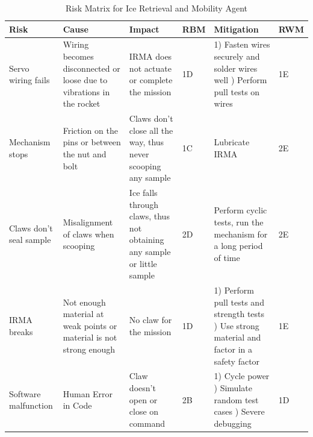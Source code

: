 \begin{table}[]
            \label{IRMA}
            {\footnotesize
            \caption{Risk Matrix for Ice Retrieval and Mobility Agent}
            \centering
            \begin{tabularx}{\linewidth}{XXXlXl}
            \toprule
            \textbf{Risk}                                            & \textbf{Cause}                                                                                                                 & \textbf{Impact}                                                                                                                           & \textbf{RBM}  & \textbf{Mitigation}                                                                                                                                                                                     & \textbf{RWM} \\
            \midrule
            Servo wiring fails & Wiring becomes disconnected or loose due to vibrations in the rocket & IRMA does not actuate or complete the mission & \cellcolor{orange!25} 1D & 1) Fasten wires securely and solder wires well \newline 2) Perform pull tests on wires & \cellcolor{green!25} 1E \\
            Mechanism stops & Friction on the pins or between the nut and bolt & Claws don’t close all the way, thus never scooping any sample & \cellcolor{red!25} 1C & Lubricate IRMA & \cellcolor{green!25} 2E \\
            Claws don’t seal sample & Misalignment of claws when scooping & Ice falls through claws, thus not obtaining any sample or little sample & \cellcolor{orange!25} 2D & Perform cyclic tests, run the mechanism for a long period of time & \cellcolor{green!25} 2E \\
            IRMA breaks & Not enough material at weak points or material is not strong enough & No claw for the mission & \cellcolor{orange!25} 1D & 1) Perform pull tests and strength tests \newline 2) Use strong material and factor in a safety factor & \cellcolor{green!25} 1E \\
            Software malfunction & Human Error in Code & Claw doesn’t open or close on command & \cellcolor{red!25} 2B & 1) Cycle power \newline 2) Simulate random test cases \newline 3) Severe debugging & \cellcolor{orange!25} 1D \\
            \bottomrule
            \end{tabularx}
            }
        \end{table}

